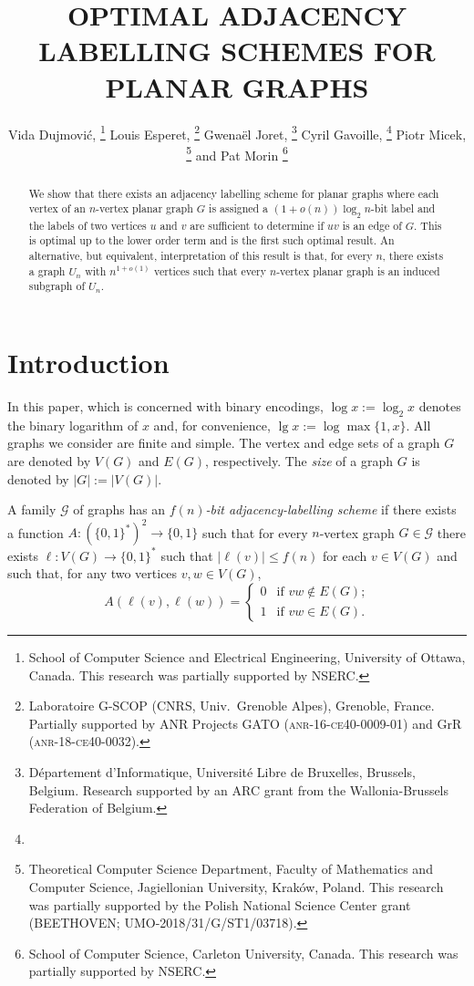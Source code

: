 \documentclass[kpfonts]{patmorin}
\title{\MakeUppercase{Optimal Adjacency Labelling Schemes for Planar Graphs}}
\author{
  Vida Dujmović,%
    \thanks{School of Computer Science and Electrical Engineering, University of Ottawa, Canada. This research was partially supported by NSERC.}\quad
  Louis Esperet,%
    \thanks{Laboratoire G-SCOP (CNRS, Univ.\ Grenoble Alpes), Grenoble, France. Partially supported by ANR Projects GATO
(\textsc{anr-16-ce40-0009-01}) and GrR (\textsc{anr-18-ce40-0032}).}\quad
  Gwenaël Joret,%
    \thanks{Département d'Informatique, Université Libre de Bruxelles, Brussels, Belgium. Research supported by an ARC grant from the Wallonia-Brussels Federation of Belgium.}\quad
  Cyril Gavoille,%
    \thanks{}\quad
  Piotr Micek,%
    \thanks{Theoretical Computer Science Department, Faculty of Mathematics and Computer Science, Jagiellonian University, Krak\'{o}w, Poland. This research was partially supported by the Polish National Science Center grant (BEETHOVEN; UMO-2018/31/G/ST1/03718).}\newline
  and Pat Morin%
    \thanks{School of Computer Science, Carleton University, Canada. This research was partially supported by NSERC.}
}
\let\le\leqslant
\begin{document}
\begin{titlepage}
\maketitle

\begin{abstract}
  We show that there exists an adjacency labelling scheme for planar graphs where each vertex of an $n$-vertex planar graph $G$ is assigned a $(1+o(n))\log_2 n$-bit label and the labels of two vertices $u$ and $v$ are sufficient to determine if $uv$ is an edge of $G$.  This is optimal up to the lower order term and is the first such optimal result.  An alternative, but equivalent, interpretation of this result is that, for every $n$, there exists a graph $U_n$ with $n^{1+o(1)}$ vertices such that every $n$-vertex planar graph is an induced subgraph of $U_n$.  
%  
\end{abstract}
\end{titlepage}
\tableofcontents

\newpage

\setcounter{page}{0}
\section{Introduction}

In this paper, which is concerned with binary encodings, $\log x:=\log_2 x$ denotes the binary logarithm of $x$ and, for convenience, $\lg x := \log\max\{1,x\}$.  All graphs we consider are finite and simple.  The vertex and edge sets of a graph $G$ are denoted by $V(G)$ and $E(G)$, respectively.  The \emph{size} of a graph $G$ is denoted by $|G|:=|V(G)|$.

A family $\mathcal{G}$ of graphs has an \emph{$f(n)$-bit adjacency-labelling scheme} if there exists a function $A:(\{0,1\}^*)^2\to \{0,1\}$ such that for every $n$-vertex graph $G\in \mathcal{G}$ there exists $\ell:V(G)\to\{0,1\}^*$ such that $|\ell(v)|\le f(n)$ for each $v\in V(G)$ and such that, for any two vertices $v,w\in V(G)$,
\[  A(\ell(v),\ell(w)) = 
      \begin{cases} 
        0 & \text{if $vw\not\in E(G)$;} \\
        1 & \text{if $vw\in E(G)$.}
      \end{cases}
\]
\end{document}
